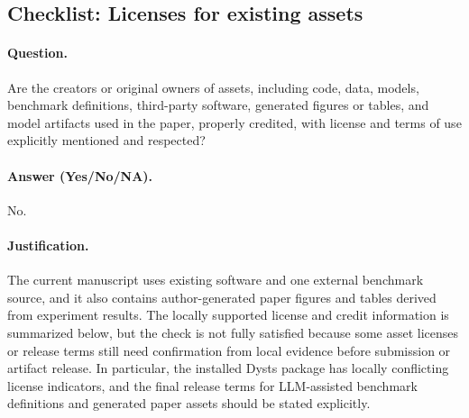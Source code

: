 \subsection{Checklist: Licenses for existing assets}
\label{app:checklist_existing_asset_licenses}

\paragraph{Question.}
Are the creators or original owners of assets, including code, data, models,
benchmark definitions, third-party software, generated figures or tables, and
model artifacts used in the paper, properly credited, with license and terms of
use explicitly mentioned and respected?

\paragraph{Answer (Yes/No/NA).}
No.

\paragraph{Justification.}
The current manuscript uses existing software and one external benchmark source,
and it also contains author-generated paper figures and tables derived from
experiment results. The locally supported license and credit information is
summarized below, but the check is not fully satisfied because some asset
licenses or release terms still need confirmation from local evidence before
submission or artifact release. In particular, the installed Dysts package has
locally conflicting license indicators, and the final release terms for
LLM-assisted benchmark definitions and generated paper assets should be stated
explicitly.

